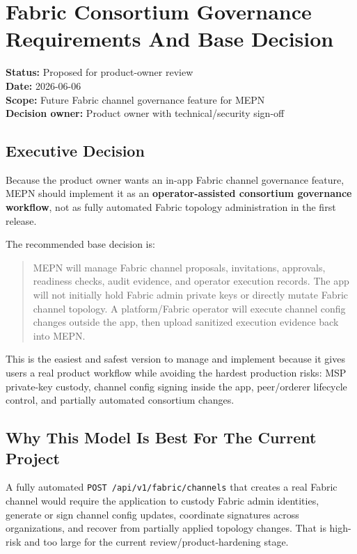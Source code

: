 \section{Fabric Consortium Governance Requirements And Base Decision}

\textbf{Status:} Proposed for product-owner review\\
\textbf{Date:} 2026-06-06\\
\textbf{Scope:} Future Fabric channel governance feature for MEPN\\
\textbf{Decision owner:} Product owner with technical/security sign-off

\subsection{Executive Decision}

Because the product owner wants an in-app Fabric channel governance feature, MEPN should implement it as an \textbf{operator-assisted consortium governance workflow}, not as fully automated Fabric topology administration in the first release.

The recommended base decision is:

\begin{quote}
MEPN will manage Fabric channel proposals, invitations, approvals, readiness checks, audit evidence, and operator execution records. The app will not initially hold Fabric admin private keys or directly mutate Fabric channel topology. A platform/Fabric operator will execute channel config changes outside the app, then upload sanitized execution evidence back into MEPN.
\end{quote}

This is the easiest and safest version to manage and implement because it gives users a real product workflow while avoiding the hardest production risks: MSP private-key custody, channel config signing inside the app, peer/orderer lifecycle control, and partially automated consortium changes.

\subsection{Why This Model Is Best For The Current Project}

A fully automated \texttt{POST /api/v1/fabric/channels} that creates a real Fabric channel would require the application to custody Fabric admin identities, generate or sign channel config updates, coordinate signatures across organizations, and recover from partially applied topology changes. That is high-risk and too large for the current review/product-hardening stage.

